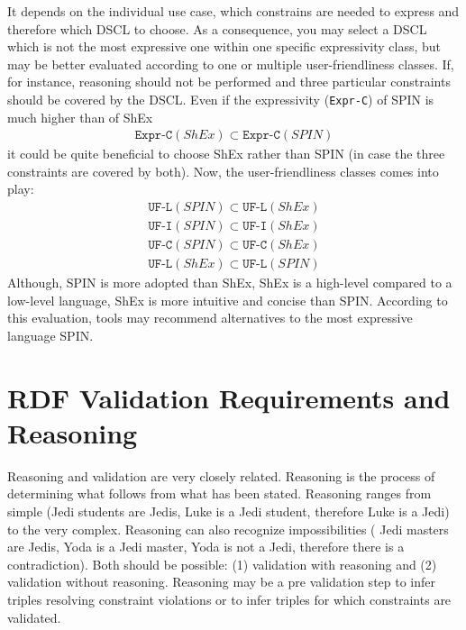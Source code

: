 \documentclass{llncs}
\newcommand{\ms}[1]{\texttt{#1}}
\begin{document}
It depends on the individual use case, which constrains are needed to express and therefore which DSCL to choose.
As a consequence, you may select a DSCL which is not the most expressive one within one specific expressivity class, 
but may be better evaluated according to one or multiple user-friendliness classes.
If, for instance, reasoning should not be performed and three particular constraints should be covered by the DSCL.
Even if the expressivity (\ms{Expr-C}) of SPIN is much higher than of ShEx  
\begin{eqnarray*}
\ms{Expr-C}(ShEx) \subset \ms{Expr-C}(SPIN)
\end{eqnarray*}
it could be quite beneficial to choose ShEx rather than SPIN (in case the three constraints are covered by both).
Now, the user-friendliness classes comes into play:
\begin{eqnarray*}
\ms{UF-L}(SPIN) \subset \ms{UF-L}(ShEx) \\
\ms{UF-I}(SPIN) \subset \ms{UF-I}(ShEx) \\
\ms{UF-C}(SPIN) \subset \ms{UF-C}(ShEx) \\
\ms{UF-L}(ShEx) \subset \ms{UF-L}(SPIN)
\end{eqnarray*}
Although, SPIN is more adopted than ShEx, ShEx is a high-level compared to a low-level language, ShEx is more intuitive and concise than SPIN.
According to this evaluation, tools may recommend alternatives to the most expressive language SPIN.  

\section{RDF Validation Requirements and Reasoning}
\label{sec:rdf-validation-requirements-and-reasoning}

Reasoning and validation are very closely related. 
Reasoning is the process of determining what follows from what has been
stated.  Reasoning ranges from simple (Jedi students are Jedis, Luke is a Jedi student, therefore Luke is a Jedi) to the very complex. Reasoning can
also recognize impossibilities ( Jedi masters are Jedis, Yoda is a Jedi master, Yoda
is not a Jedi, therefore there is a contradiction). 
Both should be possible: (1) validation with reasoning and (2) validation without reasoning. 
Reasoning may be a pre validation step to infer triples resolving constraint violations or to infer triples for which constraints are validated.
\end{document}
